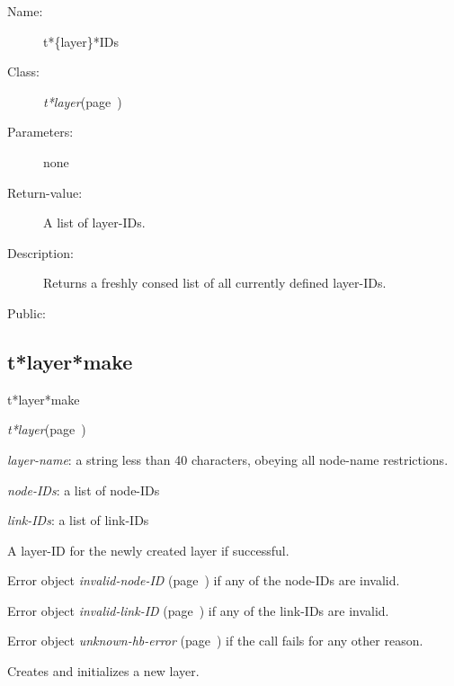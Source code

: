 \begin{description}
\item [Name:]  t*\{layer\}*IDs

\item [Class:] {\sl t*layer}\hfill(page~\pageref{t*layer})

\item [Parameters:] none

\item [Return-value:]

A list of layer-IDs.

\item [Description:]

Returns a freshly consed list of all currently
defined layer-IDs.

\item [Public:]



\end{description}
\horizontalline

\subsection{t*layer*make}
\label{t*layer*make}

\begin{description}
\item [Name:]  t*layer*make

\item [Class:] {\sl t*layer}\hfill(page~\pageref{t*layer})

\item [Parameters:]
\item {\sl layer-name}:  a string less than 40 characters, obeying
all node-name restrictions. 


\item {\sl node-IDs}:  a list of node-IDs


\item {\sl link-IDs}:  a list of link-IDs


\item [Return-value:]
A layer-ID for the newly created layer if successful.

Error object {\sl invalid-node-ID} (page~\pageref{invalid-node-ID}) if any of the node-IDs
are invalid.

Error object {\sl invalid-link-ID} (page~\pageref{invalid-link-ID}) if any of the link-IDs
are invalid.

Error object {\sl unknown-hb-error} (page~\pageref{unknown-hb-error}) if the call fails
for any other reason.

\item [Description:]

Creates and initializes a new layer. 

\item [Public:]



\end{description}
\horizontalline

